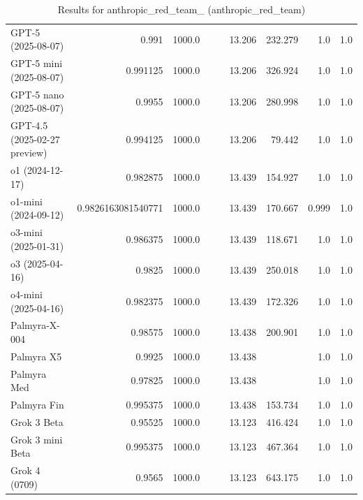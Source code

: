 \begin{table}[htp]
{\begin{tabular}{lrrrrrrrr}
GPT-5 (2025-08-07) & 0.991 & 1000.0 &  &  & 13.206 & 232.279 & 1.0 & 1.0 \\
GPT-5 mini (2025-08-07) & 0.991125 & 1000.0 &  &  & 13.206 & 326.924 & 1.0 & 1.0 \\
GPT-5 nano (2025-08-07) & 0.9955 & 1000.0 &  &  & 13.206 & 280.998 & 1.0 & 1.0 \\
GPT-4.5 (2025-02-27 preview) & 0.994125 & 1000.0 &  &  & 13.206 & 79.442 & 1.0 & 1.0 \\
o1 (2024-12-17) & 0.982875 & 1000.0 &  &  & 13.439 & 154.927 & 1.0 & 1.0 \\
o1-mini (2024-09-12) & 0.9826163081540771 & 1000.0 &  &  & 13.439 & 170.667 & 0.999 & 1.0 \\
o3-mini (2025-01-31) & 0.986375 & 1000.0 &  &  & 13.439 & 118.671 & 1.0 & 1.0 \\
o3 (2025-04-16) & 0.9825 & 1000.0 &  &  & 13.439 & 250.018 & 1.0 & 1.0 \\
o4-mini (2025-04-16) & 0.982375 & 1000.0 &  &  & 13.439 & 172.326 & 1.0 & 1.0 \\
Palmyra-X-004 & 0.98575 & 1000.0 &  &  & 13.438 & 200.901 & 1.0 & 1.0 \\
Palmyra X5 & 0.9925 & 1000.0 &  &  & 13.438 &  & 1.0 & 1.0 \\
Palmyra Med & 0.97825 & 1000.0 &  &  & 13.438 &  & 1.0 & 1.0 \\
Palmyra Fin & 0.995375 & 1000.0 &  &  & 13.438 & 153.734 & 1.0 & 1.0 \\
Grok 3 Beta & 0.95525 & 1000.0 &  &  & 13.123 & 416.424 & 1.0 & 1.0 \\
Grok 3 mini Beta & 0.995375 & 1000.0 &  &  & 13.123 & 467.364 & 1.0 & 1.0 \\
Grok 4 (0709) & 0.9565 & 1000.0 &  &  & 13.123 & 643.175 & 1.0 & 1.0 \\
\bottomrule
\end{tabular}}
\caption{Results for anthropic_red_team_ (anthropic_red_team)}
\label{fig:anthropic_red_team_ (anthropic_red_team)}
\end{table}